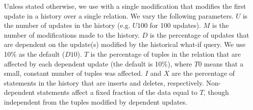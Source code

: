 %
Unless stated otherwise, we use \abbrHWs with a single modification that modifies the first update in a history over a single relation.
We vary the following parameters. $U$ is the number of updates in the history (e.g. $U100$ for 100 updates). %
$M$ is the number of modifications made to the history.
$D$ is the percentage of updates that are dependent on the update(s) modified by the historical what-if query. We use 10\% as the default  ($D10$).
$T$ is the percentage of tuples in the relation that are affected by each dependent update (the default is 10\%), where $T0$ means that a small, constant number of tuples was affected. $I$ and $X$ are the percentage of statements in the history that are inserts and deletes, respectively.
Non-dependent statements affect a fixed fraction of the data equal to $T$, though independent from the tuples modified by dependent updates. %



%

